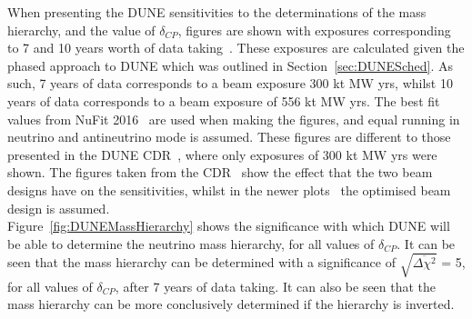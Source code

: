 When presenting the DUNE sensitivities to the determinations of the mass hierarchy, and the value of $\delta_{CP}$, figures are shown with exposures corresponding to 7 and 10 years worth of data taking~\citep{Elizabeth_01_17}. These exposures are calculated given the phased approach to DUNE which was outlined in Section~\ref{sec:DUNESched}. As such, 7 years of data corresponds to a beam exposure 300 kt MW yrs, whilst 10 years of data corresponds to a beam exposure of 556 kt MW yrs. The best fit values from NuFit 2016~\citep{NuFit2016} are used when making the figures, and equal running in neutrino and antineutrino mode is assumed. These figures are different to those presented in the DUNE CDR~\citep{DUNECDR_V2}, where only exposures of 300 kt MW yrs were shown. The figures taken from the CDR~\citep{DUNECDR_V2} show the effect that the two beam designs have on the sensitivities, whilst in the newer plots~\citep{DUNE2332, DUNE2335, DUNE2377, DUNE2401, DUNE2407} the optimised beam design is assumed. \\

Figure~\ref{fig:DUNEMassHierarchy} shows the significance with which DUNE will be able to determine the neutrino mass hierarchy, for all values of $\delta_{CP}$. It can be seen that the mass hierarchy can be determined with a significance of $\sqrt{\overline{\Delta{\chi^2}}}$ = 5, for all values of $\delta_{CP}$, after 7 years of data taking. It can also be seen that the mass hierarchy can be more conclusively determined if the hierarchy is inverted. \\


